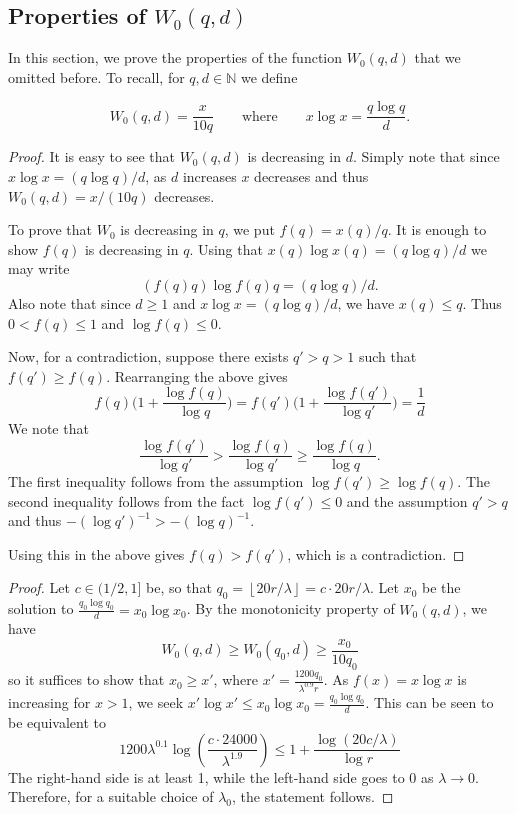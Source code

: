 \documentclass[12pt,reqno]{amsart}
\theoremstyle{remark}
\numberwithin{theorem}{section}
\renewcommand{\(}{\bigl(}
\renewcommand{\)}{\bigr)\vphantom{)}}
\renewcommand{\leq}{\le}
\renewcommand{\geq}{\ge}
\renewcommand{\le}{\leqslant}
\renewcommand{\ge}{\geqslant}
\newcommand{\NN}{\mathbb{N}}
\begin{document}
\subsection{Properties of $W_0(q,d)$}\label{sec:appWprop}

In this section, we prove the properties of the function $W_0(q,d)$ that we omitted before. To recall, for $q,d\in\NN$ we define

\[W_0(q, d)=\frac{x}{10q} \qquad \text{where} \qquad x\log x= \frac{q \log q}{d}.\]

\mono*

\begin{proof}
It is easy to see that $W_0(q,d)$ is decreasing in $d$. Simply note that since 
 $x\log x = (q\log q)/d$, as $d$ increases $x$ decreases and thus $W_0(q,d) = x/(10q)$ decreases. 


To prove that $W_0$ is decreasing in $q$, we put $f(q) = x(q)/q$. It is enough to show $f(q)$ is decreasing in $q$. Using that $x(q)\log x(q) = (q\log q)/d$ we may write 
\[ (f(q)q)\log f(q)q = (q \log q)/d. \]
Also note that since $d \geq1 $ and $x\log x  = (q\log q)/d$, we have $x(q) \leq q$. Thus $0 < f(q) \leq 1$ and $\log f(q) \leq 0$.

Now, for a contradiction, suppose there exists $q' > q > 1$ such that
$f(q') \geq f(q)$. Rearranging the above gives
\[  f(q)\Big( 1 + \frac{\log f(q)}{\log q} \Big) = f(q')\Big( 1 + \frac{\log f(q')}{\log q'} \Big)  =  \frac{1}{d} \]
We note that 
\[ \frac{\log f(q')}{\log q'} > \frac{\log f(q)}{\log q'} \geq \frac{\log f(q)}{\log q } .\] The first inequality follows from the assumption $\log f(q') \geq \log f(q)$. The second inequality follows from the fact $\log f(q') \leq  0 $ and the assumption $q'>q$ and thus $-(\log q')^{-1} >- (\log q)^{-1}$.

Using this in the above gives $f(q) > f(q')$, which is a contradiction. 
\end{proof}

\lambdaballsandbins*

\begin{proof}
    Let $c\in (1/2,1]$ be, so that $q_0=\left\lfloor20r/\lambda\right\rfloor=c\cdot 20r/\lambda$.
    Let $x_0$ be the solution to $\frac{q_0 \log q_0}{d}=x_0 \log x_0$. By the monotonicity property of $W_0(q,d)$, we have
    \[W_0(q,d)\geq W_0(q_0,d)\geq \frac{x_0}{10q_0}\]
    so it suffices to show that $x_0\geq x'$, where $x'=\frac{1200q_0}{\lambda^{0.9}r}$. As $f(x)=x\log x$ is increasing for $x>1$, we seek $x'\log x'\leq x_0\log x_0=\frac{q_0\log q_0}{d}$. This can be seen to be equivalent to
    \[1200 \lambda^{0.1}\log\left(\frac{c\cdot 24000}{\lambda^{1.9}}\right)\leq 1+\frac{\log(20c/\lambda)}{\log r}\]
    The right-hand side is at least 1, while the left-hand side goes to $0$ as $\lambda \to 0$. Therefore, for a suitable choice of $\lambda_0$, the statement follows. 
\end{proof}
\end{document}
